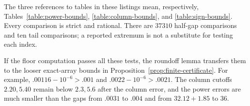 The three references to tables in these listings mean, respectively,
Tables~\ref{table:power-bounds}, \ref{table:column-bounds}, and
\ref{table:sign-bounds}.  Every comparison is strict and
rational.  There are $37310$ half-gap comparisons and ten tail comparisons;
a reported extremum is not a substitute for testing each index.

If the floor computation passes all these tests, the roundoff lemma transfers
them to the looser exact-array bounds in
Proposition~\ref{prop:finite-certificate}.  For example,
$.00116-10^{-6}>.001$ and $.0022-10^{-6}>.0021$.
The column cutoffs $2.20,5.40$ remain below $2.3,5.6$ after the column
error, and the power errors are much smaller than the gaps from $.0031$
to $.004$ and from $32.12+1.85$ to $36$.

